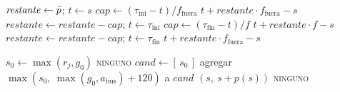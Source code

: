 \begin{algorithm}[H]
\caption{Tiempo de viaje $p_j(s)$}\label{alg:tiempo}
\begin{algorithmic}[1]
  \State $\mathit{restante} \gets \bar{p}$;\; $t \gets s$
     
      \State $\mathit{cap} \gets (\tau_{\text{ini}} - t)/f_{\text{fuera}}$
       \Return $t + \mathit{restante}\cdot f_{\text{fuera}} - s$ \EndIf
      \State $\mathit{restante} \gets \mathit{restante} - \mathit{cap}$;\; $t \gets \tau_{\text{ini}}$
    \EndIf
    \State $\mathit{cap} \gets (\tau_{\text{fin}} - t)/f$ 
     \Return $t + \mathit{restante}\cdot f - s$ \EndIf
    \State $\mathit{restante} \gets \mathit{restante} - \mathit{cap}$;\; $t \gets \tau_{\text{fin}}$
  \EndFor
  \State \Return $t + \mathit{restante}\cdot f_{\text{fuera}} - s$ 
\EndFunction
\end{algorithmic}
\end{algorithm}

\begin{algorithm}[H]
\caption{Salida factible más temprana en un bus}\label{alg:hueco}
\begin{algorithmic}[1]
    \State $s_0 \gets \max(r_j, g_0)$
     \Return \textsc{ninguno} \EndIf
    \State $\mathit{cand} \gets [\,s_0\,]$
     
      \State agregar $\max(s_0,\ \max(g_0, a_{\text{bus}}) + 120)$ a $\mathit{cand}$
    \EndIf
       \Break {} \EndIf
      \If{el almuerzo aún cabe con $[s, s + p(s))$ ocupado} \Return $(s,\ s + p(s))$ \EndIf
    \EndFor
  \EndFor
  \State \Return \textsc{ninguno}
\EndFunction
\end{algorithmic}
\end{algorithm}

